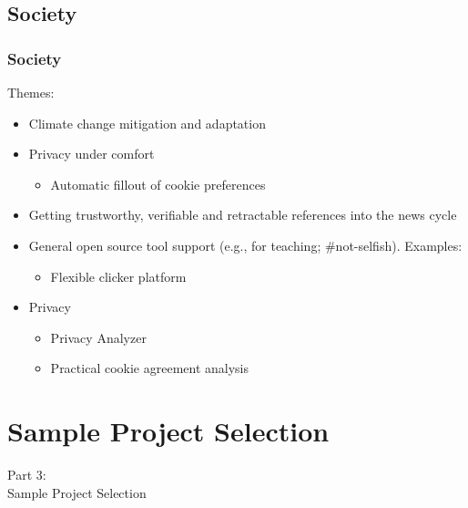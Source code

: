 \subsection{Society}
\begin{frame}
  \frametitle{Society}
  \vspace{3mm}
  Themes:
  \begin{itemize}
    \item Climate change mitigation and adaptation
    \item Privacy under comfort
      \begin{itemize}
        \item Automatic fillout of cookie preferences
      \end{itemize}
    \item Getting trustworthy, verifiable and retractable references into the news cycle
    \item General open source tool support (e.g., for teaching; \#not-selfish). Examples:
      \begin{itemize}
        \item Flexible clicker platform
          \\
      \end{itemize}
    \item Privacy
      \begin{itemize}
        \item Privacy Analyzer
          \\
        \item Practical cookie agreement analysis
          \\
      \end{itemize}
  \end{itemize}
\end{frame}

\section{Sample Project Selection}
\begin{frame}
  \vspace{25mm}
  \begin{center}
    \Huge{Part 3:\\Sample Project Selection}
  \end{center}
\end{frame}

